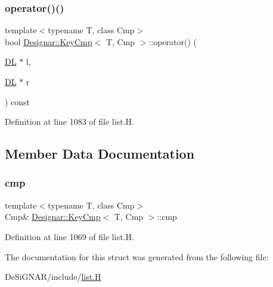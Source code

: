 \subsubsection{\texorpdfstring{operator()()}{operator()()}}
{\footnotesize\ttfamily template$<$typename T, class Cmp$>$ \\
bool \hyperlink{struct_designar_1_1_key_cmp}{Designar\+::\+Key\+Cmp}$<$ T, Cmp $>$\+::operator() (\begin{DoxyParamCaption}\item[{\hyperlink{class_designar_1_1_d_l}{DL} $\ast$}]{l,  }\item[{\hyperlink{class_designar_1_1_d_l}{DL} $\ast$}]{r }\end{DoxyParamCaption}) const\hspace{0.3cm}{\ttfamily [inline]}}



Definition at line 1083 of file list.\+H.



\subsection{Member Data Documentation}
\mbox{\label{struct_designar_1_1_key_cmp_a459613d03deb91c821f26cfafdd93dab}} 
\subsubsection{\texorpdfstring{cmp}{cmp}}
{\footnotesize\ttfamily template$<$typename T, class Cmp$>$ \\
Cmp\& \hyperlink{struct_designar_1_1_key_cmp}{Designar\+::\+Key\+Cmp}$<$ T, Cmp $>$\+::cmp}



Definition at line 1069 of file list.\+H.



The documentation for this struct was generated from the following file\+:\begin{DoxyCompactItemize}
\item 
De\+Si\+G\+N\+A\+R/include/\hyperlink{list_8_h}{list.\+H}\end{DoxyCompactItemize}
